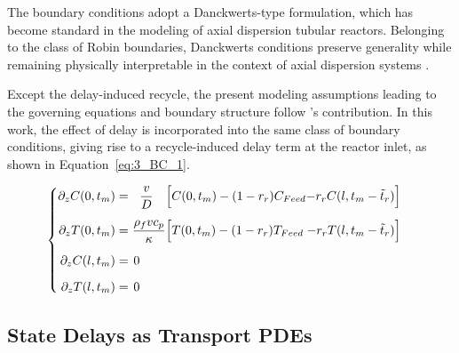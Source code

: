 The boundary conditions adopt a Danckwerts-type formulation, which has become standard in the modeling of axial dispersion tubular reactors. Belonging to the class of Robin boundaries, Danckwerts conditions preserve generality while remaining physically interpretable in the context of axial dispersion systems \autocite{Danckwerts1953Continuous}.

Except the delay-induced recycle, the present modeling assumptions leading to the governing equations and boundary structure follow 's contribution\autocite{Khatibi2021Model}. In this work, the effect of delay is incorporated into the same class of boundary conditions, giving rise to a recycle-induced delay term at the reactor inlet, as shown in Equation~\eqref{eq:3_BC_1}.

\begin{equation} \label{eq:3_BC_1}
\begin{cases}
    \begin{alignedat}{3}
        \partial_{z} C(0, t_m) &=& \dfrac{v}{D} \quad \Bigl[                           &C(0, t_m) - (1-r_r) C_{Feed} & - r_r C(l, t_m-\tilde{t}_r) \Bigr] & \\[1.4ex]
        \partial_{z} T(0, t_m) &=& \hspace{0.3em} \dfrac{\rho_f v c_p}{\kappa} \Bigl[ &T(0, t_m) - (1-r_r) T_{Feed} & - r_r T(l, t_m-\tilde{t}_r) \Bigr] & \\[1.4ex]
        \partial_{z} C(l, t_m) &=& 0 \hspace{0.9cm}                                    &                           &                                  & \\[1.4ex]
        \partial_{z} T(l, t_m) &=& 0 \hspace{0.9cm}                                    &                           &                                  & \\
    \end{alignedat}
\end{cases}
\end{equation}

\subsection{State Delays as Transport PDEs}

